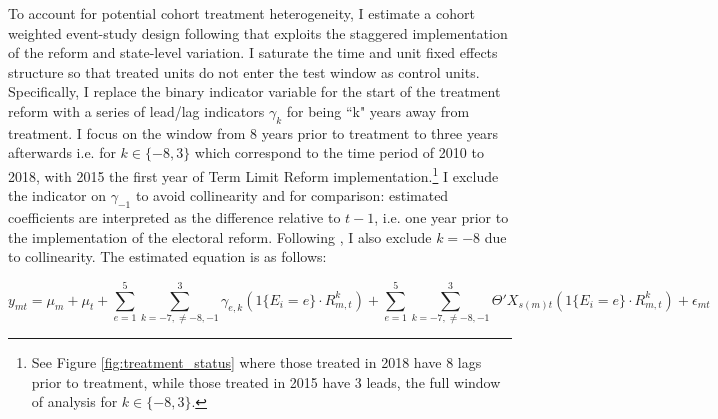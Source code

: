 \documentclass[12pt]{amsart}
\numberwithin{equation}{section}
\theoremstyle{definition}
\theoremstyle{definition}
\theoremstyle{definition}
\begin{document}
 To account for potential cohort treatment heterogeneity, I estimate  a cohort weighted event-study design following \citet{abraham_sun_2020} that exploits the staggered implementation of the reform and state-level variation. 
 I saturate the time and unit fixed effects structure so that treated units do not enter the test window as control units. Specifically, I replace the binary indicator variable for the start of the treatment reform with a series of lead/lag indicators $\gamma_k$ for being ``k" years away from treatment. I focus on the window from 8 years prior to treatment to three years afterwards i.e. for $k \in \{-8,3\} $ which correspond to the time period of 2010 to 2018, with 2015 the first year of Term Limit Reform implementation.\footnote{See Figure \ref{fig:treatment_status} where those treated in 2018 have 8 lags prior to treatment, while those treated in 2015 have 3 leads, the full window of analysis for $k \in \{-8,3\} $.} %
I exclude the indicator on $\gamma_{-1}$ to avoid collinearity and for comparison: estimated coefficients are interpreted as the difference relative to $t-1$, i.e. one year prior to the implementation of the electoral reform. Following   \citet{abraham_sun_2020}, I also exclude $k=-8$ due to collinearity. The estimated equation is as follows:


 
 \begin{equation}
\label{eq:abraham} 
y_{mt}=\mu_m + \mu_t + \sum^{5}_{e=1} \sum^3_{k=-7, \neq {-8,-1}} \gamma_{e,k}(1\{E_i=e\} \cdot R^k_{m,t}) + \sum^{5}_{e=1} \sum^3_{k=-7, \neq {-8,-1}}  \Theta'X_{s(m)t} (1\{E_i=e\} \cdot R^k_{m,t}) + \epsilon_{mt}
\end{equation} 
  
\end{document}
